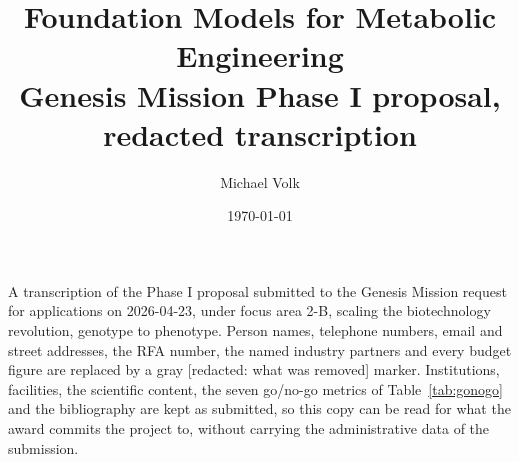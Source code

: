 \documentclass[10pt,a4paper]{article}
\title{\vspace{-1.5em}Foundation Models for Metabolic Engineering\\
\large Genesis Mission Phase I proposal, redacted transcription}
\author{Michael Volk}
\date{\today}
\newcommand{\redacted}[1]{\textcolor{tcgray}{[redacted: #1]}}
\begin{document}
\maketitle
\thispagestyle{empty}

\noindent
A transcription of the Phase I proposal submitted to the Genesis Mission request
for applications on 2026-04-23, under focus area 2-B, scaling the biotechnology
revolution, genotype to phenotype. Person names, telephone numbers, email and
street addresses, the RFA number, the named industry partners and every budget
figure are replaced by a gray \redacted{what was removed} marker. Institutions,
facilities, the scientific content, the seven go/no-go metrics of
Table~\ref{tab:gonogo} and the bibliography are kept as submitted, so this copy can
be read for what the award commits the project to, without carrying the
administrative data of the submission.

\vspace{0.5em}
\tccontents
\clearpage








\end{document}

